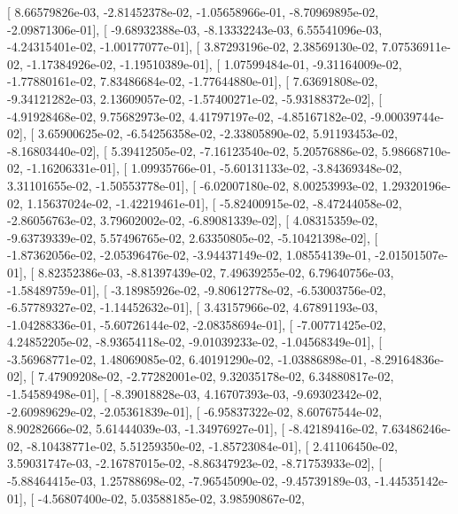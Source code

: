 \documentclass{article}
\begin{document}
       [  8.66579826e-03,  -2.81452378e-02,  -1.05658966e-01,
         -8.70969895e-02,  -2.09871306e-01],
       [ -9.68932388e-03,  -8.13332243e-03,   6.55541096e-03,
         -4.24315401e-02,  -1.00177077e-01],
       [  3.87293196e-02,   2.38569130e-02,   7.07536911e-02,
         -1.17384926e-02,  -1.19510389e-01],
       [  1.07599484e-01,  -9.31164009e-02,  -1.77880161e-02,
          7.83486684e-02,  -1.77644880e-01],
       [  7.63691808e-02,  -9.34121282e-03,   2.13609057e-02,
         -1.57400271e-02,  -5.93188372e-02],
       [ -4.91928468e-02,   9.75682973e-02,   4.41797197e-02,
         -4.85167182e-02,  -9.00039744e-02],
       [  3.65900625e-02,  -6.54256358e-02,  -2.33805890e-02,
          5.91193453e-02,  -8.16803440e-02],
       [  5.39412505e-02,  -7.16123540e-02,   5.20576886e-02,
          5.98668710e-02,  -1.16206331e-01],
       [  1.09935766e-01,  -5.60131133e-02,  -3.84369348e-02,
          3.31101655e-02,  -1.50553778e-01],
       [ -6.02007180e-02,   8.00253993e-02,   1.29320196e-02,
          1.15637024e-02,  -1.42219461e-01],
       [ -5.82400915e-02,  -8.47244058e-02,  -2.86056763e-02,
          3.79602002e-02,  -6.89081339e-02],
       [  4.08315359e-02,  -9.63739339e-02,   5.57496765e-02,
          2.63350805e-02,  -5.10421398e-02],
       [ -1.87362056e-02,  -2.05396476e-02,  -3.94437149e-02,
          1.08554139e-01,  -2.01501507e-01],
       [  8.82352386e-03,  -8.81397439e-02,   7.49639255e-02,
          6.79640756e-03,  -1.58489759e-01],
       [ -3.18985926e-02,  -9.80612778e-02,  -6.53003756e-02,
         -6.57789327e-02,  -1.14452632e-01],
       [  3.43157966e-02,   4.67891193e-03,  -1.04288336e-01,
         -5.60726144e-02,  -2.08358694e-01],
       [ -7.00771425e-02,   4.24852205e-02,  -8.93654118e-02,
         -9.01039233e-02,  -1.04568349e-01],
       [ -3.56968771e-02,   1.48069085e-02,   6.40191290e-02,
         -1.03886898e-01,  -8.29164836e-02],
       [  7.47909208e-02,  -2.77282001e-02,   9.32035178e-02,
          6.34880817e-02,  -1.54589498e-01],
       [ -8.39018828e-03,   4.16707393e-03,  -9.69302342e-02,
         -2.60989629e-02,  -2.05361839e-01],
       [ -6.95837322e-02,   8.60767544e-02,   8.90282666e-02,
          5.61444039e-03,  -1.34976927e-01],
       [ -8.42189416e-02,   7.63486246e-02,  -8.10438771e-02,
          5.51259350e-02,  -1.85723084e-01],
       [  2.41106450e-02,   3.59031747e-03,  -2.16787015e-02,
         -8.86347923e-02,  -8.71753933e-02],
       [ -5.88464415e-03,   1.25788698e-02,  -7.96545090e-02,
         -9.45739189e-03,  -1.44535142e-01],
       [ -4.56807400e-02,   5.03588185e-02,   3.98590867e-02,
\end{document}
